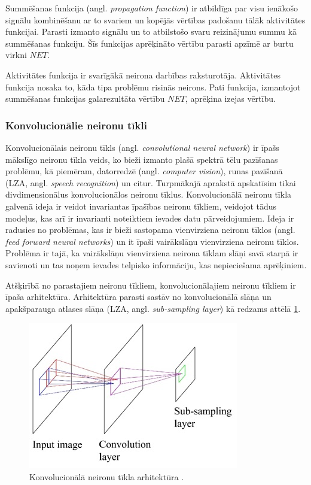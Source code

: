 \documentclass[12pt,paper=a4]{report}
\begin{document}
Summēšanas funkcija (angl. \textit{propagation function}) ir atbildīga par visu ienākošo signālu kombinēšanu ar to svariem un kopējās vērtības padošanu tālāk aktivitātes funkcijai. Parasti izmanto signālu un to atbilstošo svaru reizinājumu summu kā summēšanas funkciju. Šīs funkcijas aprēķināto vērtību parasti apzīmē ar burtu virkni $NET$.\cite{zutersNeironuTikli}\par
Aktivitātes funkcija ir svarīgākā neirona darbības raksturotāja. Aktivitātes funkcija nosaka to, kāda tipa problēmu risinās neirons. Pati funkcija, izmantojot summēšanas funkcijas galarezultāta vērtību $NET$, aprēķina izejas vērtību.\cite{zutersNeironuTikli}
\subsubsection{Konvolucionālie neironu tīkli}
Konvolucionālais neironu tīkls (angl. \textit{convolutional neural network}) ir īpašs mākslīgo neironu tīkla veids, ko bieži izmanto plašā spektrā tēlu pazīšanas problēmu, kā piemēram, datorredzē (angl. \textit{computer vision}), runas pazīšanā (LZA, angl. \textit{speech recognition}) un citur. Turpmākajā aprakstā apskatīsim tikai divdimensionālus konvolucionālos neironu tīklus. Konvolucionālā neironu tīkla galvenā ideja ir veidot invariantas īpašības neironu tīkliem, veidojot tādus modeļus, kas arī ir invarianti noteiktiem ievades datu pārveidojumiem. Ideja ir radusies no problēmas, kas ir bieži sastopama vienvirziena neironu tīklos (angl. \textit{feed forward neural networks}) un it īpaši vairākslāņu vienvirziena neironu tīklos. Problēma ir tajā, ka vairākslāņu vienvirziena neirona tīklam slāņi savā starpā ir savienoti un tas noņem ievades telpisko informāciju, kas nepieciešama aprēķiniem.\cite{fukushima1982}\par
Atšķirībā no parastajiem neironu tīkliem, konvolucionālajiem neironu tīkliem ir īpaša arhitektūra. Arhitektūra parasti sastāv no konvolucionālā slāņa un apakšparauga atlases slāņa (LZA, angl. \textit{sub-sampling layer}) kā redzams attēlā \ref{fig:architecture}.
\begin{figure}[h!]
\centering
\includegraphics[width=.5\linewidth]{convArchitecture}
\caption{Konvolucionālā neironu tīkla arhitektūra \cite{convolutionalNN}.}
\label{fig:architecture}
\end{figure}
\end{document}
